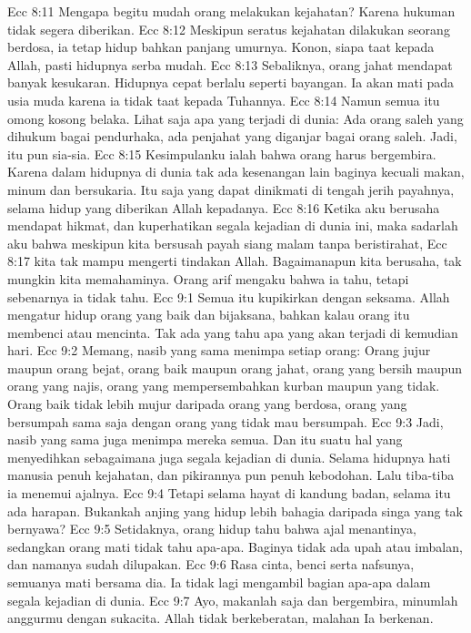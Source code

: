 Ecc 8:11  Mengapa begitu mudah orang melakukan kejahatan? Karena hukuman tidak segera diberikan.
Ecc 8:12  Meskipun seratus kejahatan dilakukan seorang berdosa, ia tetap hidup bahkan panjang umurnya. Konon, siapa taat kepada Allah, pasti hidupnya serba mudah.
Ecc 8:13  Sebaliknya, orang jahat mendapat banyak kesukaran. Hidupnya cepat berlalu seperti bayangan. Ia akan mati pada usia muda karena ia tidak taat kepada Tuhannya.
Ecc 8:14  Namun semua itu omong kosong belaka. Lihat saja apa yang terjadi di dunia: Ada orang saleh yang dihukum bagai pendurhaka, ada penjahat yang diganjar bagai orang saleh. Jadi, itu pun sia-sia.
Ecc 8:15  Kesimpulanku ialah bahwa orang harus bergembira. Karena dalam hidupnya di dunia tak ada kesenangan lain baginya kecuali makan, minum dan bersukaria. Itu saja yang dapat dinikmati di tengah jerih payahnya, selama hidup yang diberikan Allah kepadanya.
Ecc 8:16  Ketika aku berusaha mendapat hikmat, dan kuperhatikan segala kejadian di dunia ini, maka sadarlah aku bahwa meskipun kita bersusah payah siang malam tanpa beristirahat,
Ecc 8:17  kita tak mampu mengerti tindakan Allah. Bagaimanapun kita berusaha, tak mungkin kita memahaminya. Orang arif mengaku bahwa ia tahu, tetapi sebenarnya ia tidak tahu.
Ecc 9:1  Semua itu kupikirkan dengan seksama. Allah mengatur hidup orang yang baik dan bijaksana, bahkan kalau orang itu membenci atau mencinta. Tak ada yang tahu apa yang akan terjadi di kemudian hari.
Ecc 9:2  Memang, nasib yang sama menimpa setiap orang: Orang jujur maupun orang bejat, orang baik maupun orang jahat, orang yang bersih maupun orang yang najis, orang yang mempersembahkan kurban maupun yang tidak. Orang baik tidak lebih mujur daripada orang yang berdosa, orang yang bersumpah sama saja dengan orang yang tidak mau bersumpah.
Ecc 9:3  Jadi, nasib yang sama juga menimpa mereka semua. Dan itu suatu hal yang menyedihkan sebagaimana juga segala kejadian di dunia. Selama hidupnya hati manusia penuh kejahatan, dan pikirannya pun penuh kebodohan. Lalu tiba-tiba ia menemui ajalnya.
Ecc 9:4  Tetapi selama hayat di kandung badan, selama itu ada harapan. Bukankah anjing yang hidup lebih bahagia daripada singa yang tak bernyawa?
Ecc 9:5  Setidaknya, orang hidup tahu bahwa ajal menantinya, sedangkan orang mati tidak tahu apa-apa. Baginya tidak ada upah atau imbalan, dan namanya sudah dilupakan.
Ecc 9:6  Rasa cinta, benci serta nafsunya, semuanya mati bersama dia. Ia tidak lagi mengambil bagian apa-apa dalam segala kejadian di dunia.
Ecc 9:7  Ayo, makanlah saja dan bergembira, minumlah anggurmu dengan sukacita. Allah tidak berkeberatan, malahan Ia berkenan.
